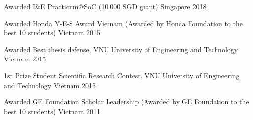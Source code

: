 
\begin{cvhonors}

\cvhonor
    {Awarded} %
    {\href{https://www.comp.nus.edu.sg/entrepreneurship/awards/winners/}{I\&E Practicum@SoC} (10,000 SGD grant)} %
    {Singapore} %
    {2018} %

  \cvhonor
    {Awarded} %
    {\href{http://www.hondafoundation.jp/yes/index_en/184}{Honda Y-E-S Award Vietnam} (Awarded by Honda Foundation to the best 10 students)} %
    {Vietnam} %
    {2015} %

  \cvhonor
    {Awarded} %
    {Best thesis defense, VNU University of Engineering and Technology} %
    {Vietnam} %
    {2015} %

  \cvhonor
    {1st Prize} %
    {Student Scientific Research Contest, VNU University of Engineering and Technology} %
    {Vietnam} %
    {2015} %

  \cvhonor
    {Awarded} %
    {GE Foundation Scholar Leadership (Awarded by GE Foundation to the best 10 students)} %
    {Vietnam} %
    {2011} %

\end{cvhonors}






